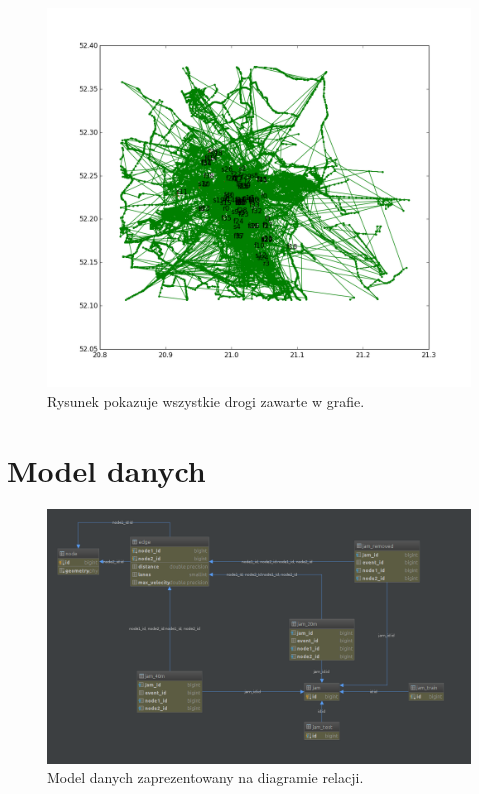 \documentclass[a4paper,12pt]{mwart}
\begin{document}
\begin{figure}[h]
\centerline{\includegraphics[width=\textwidth]{figures/map.png}}
\caption{Rysunek pokazuje wszystkie drogi zawarte w grafie.}
\end{figure}

\section{Model danych}

\begin{figure}[H]
\centerline{\includegraphics[width=\textwidth]{figures/diagram.png}}
\caption{Model danych zaprezentowany na diagramie relacji.}
\end{figure}
\end{document}
